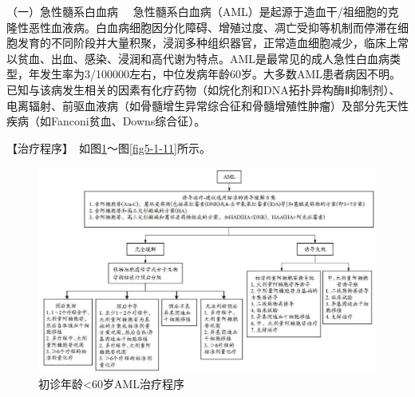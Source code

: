 {（一）急性髓系白血病}
　急性髓系白血病（AML）是起源于造血干/祖细胞的克隆性恶性血液病。白血病细胞因分化障碍、增殖过度、凋亡受抑等机制而停滞在细胞发育的不同阶段并大量积聚，浸润多种组织器官，正常造血细胞减少，临床上常以贫血、出血、感染、浸润和高代谢为特点。AML是最常见的成人急性白血病类型，年发生率为3/100000左右，中位发病年龄60岁。大多数AML患者病因不明。已知与该病发生相关的因素有化疗药物（如烷化剂和DNA拓扑异构酶Ⅱ抑制剂）、电离辐射、前驱血液病（如骨髓增生异常综合征和骨髓增殖性肿瘤）及部分先天性疾病（如Fanconi贫血、Downs综合征）。

【治疗程序】　如图\ref{fig5-1-8}～图\ref{fig5-1-11}所示。

\begin{figure}[!htbp]
 \centering
 \includegraphics{./images/Image00141.jpg}
 \captionsetup{justification=centering}
 \caption{初诊年龄<60岁AML治疗程序}
 \label{fig5-1-8}
  \end{figure} 

